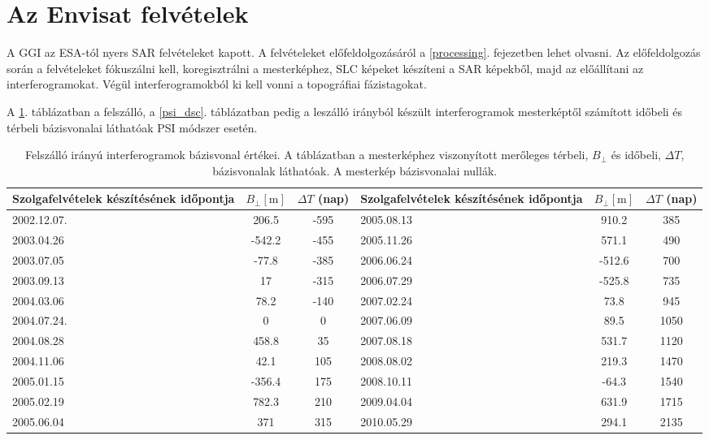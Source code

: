 \documentclass[12pt]{report}
\numberwithin{equation}{section}
\numberwithin{table}{section}
\numberwithin{figure}{section}
\begin{document}
\section{Az Envisat felvételek}

A GGI az ESA-tól nyers SAR felvételeket kapott. A felvételeket előfeldolgozásáról a \ref{processing}. fejezetben lehet olvasni. Az előfeldolgozás során a felvételeket fókuszálni kell, koregisztrálni a mesterképhez, SLC képeket készíteni a SAR képekből, majd az előállítani az interferogramokat. Végül interferogramokból ki kell vonni a topográfiai fázistagokat.

A \ref{psi_asc}. táblázatban a felszálló, a \ref{psi_dsc}. táblázatban pedig a leszálló irányból készült interferogramok mesterképtől számított időbeli és térbeli bázisvonalai láthatóak PSI módszer esetén.

\begin{table}[H]
    \begin{center}
        \begin{tabular}{m{3cm} c c || m{3cm} c c} \toprule
            Szolgafelvételek készítésének időpontja & $B_{\perp} [\si{\meter}]$ & $\Delta T$ (nap) & Szolgafelvételek készítésének időpontja & $B_{\perp} [\si{\meter}]$ & $\Delta T$ (nap)\\ \midrule
            2002.12.07. & 206.5 & -595 & 2005.08.13 & 910.2 & 385 \\
            2003.04.26 & -542.2 & -455 & 2005.11.26 & 571.1 & 490 \\
            2003.07.05 & -77.8 & -385 & 2006.06.24 & -512.6 & 700 \\
            2003.09.13 & 17 & -315 & 2006.07.29 & -525.8 & 735 \\
            2004.03.06 & 78.2 & -140 & 2007.02.24 & 73.8 & 945 \\
            2004.07.24. & 0 & 0 & 2007.06.09 & 89.5 & 1050 \\
            2004.08.28 & 458.8 & 35 & 2007.08.18 & 531.7 & 1120 \\
            2004.11.06 & 42.1 & 105 & 2008.08.02 & 219.3 & 1470 \\
            2005.01.15 & -356.4 & 175 & 2008.10.11 & -64.3 & 1540 \\
            2005.02.19 & 782.3 & 210 & 2009.04.04 & 631.9 & 1715 \\
            2005.06.04 & 371 & 315 & 2010.05.29 & 294.1 & 2135 \\ \bottomrule
        \end{tabular}
        \caption{Felszálló irányú interferogramok bázisvonal értékei. A táblázatban a mesterképhez viszonyított merőleges térbeli, $B_{\perp}$ és időbeli, $\Delta T$, bázisvonalak láthatóak. A mesterkép bázisvonalai nullák.}\label{psi_asc}
    \end{center}
\end{table}
\end{document}
